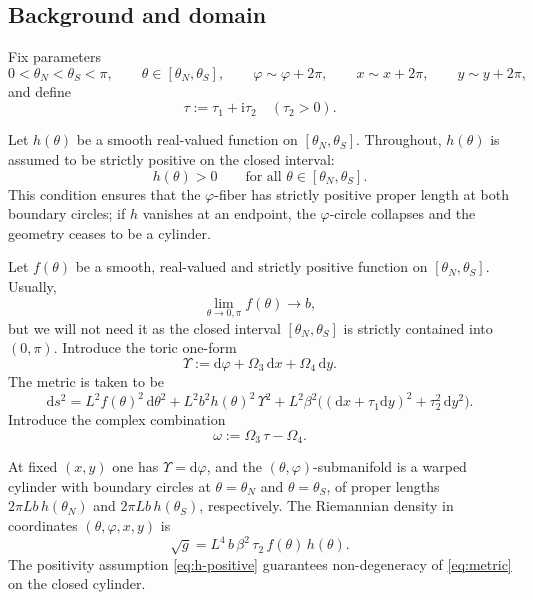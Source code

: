 \documentclass[11pt,a4paper]{article}
\numberwithin{equation}{section}
\theoremstyle{plain}
\theoremstyle{definition}
\theoremstyle{remark}
\newcommand{\ii}{\mathrm{i}}
\newcommand{\dd}{\mathrm{d}}
\begin{document}
\subsection{Background and domain}

Fix parameters
\[
0<\theta_N<\theta_S<\pi,\qquad \theta\in[\theta_N,\theta_S],\qquad
\varphi\sim\varphi+2\pi,\qquad x\sim x+2\pi,\qquad y\sim y+2\pi,
\]
and define
\begin{equation}
\tau:=\tau_1+\ii\tau_2\quad(\tau_2>0).
\label{eq:tau}
\end{equation}


Let $h(\theta)$ be a smooth real-valued function on $[\theta_N,\theta_S]$.
Throughout, $h(\theta)$ is assumed to be strictly positive on the closed interval:
\begin{equation}
h(\theta)>0\qquad \text{for all }\theta\in[\theta_N,\theta_S].
\label{eq:h-positive}
\end{equation}
This condition ensures that the $\varphi$-fiber has strictly positive proper length at both boundary circles; if $h$ vanishes at an endpoint, the $\varphi$-circle collapses and the geometry ceases to be a cylinder.

Let $f(\theta)$ be a smooth, real-valued and strictly positive  function on $[\theta_N,\theta_S]$. Usually,
\begin{equation}
\lim_{\theta\to0, \pi}f(\theta)\to b,
 \label{eq:fdef}
\end{equation}
but we will not need it as the closed interval $[\theta_N, \theta_S]$ is strictly contained into $(0, \pi)$.
Introduce the toric one-form
\begin{equation}
\Upsilon:=\dd\varphi+\Omega_3\,\dd x+\Omega_4\,\dd y .
\label{eq:Upsilon-def}
\end{equation}
The metric is taken to be
\begin{equation}
\dd s^2
=
L^2 f(\theta)^2\,\dd\theta^2
+
L^2 b^2 h(\theta)^2\,\Upsilon^2
+
L^2\beta^2\Big( (\dd x+\tau_1 \dd y)^2+\tau_2^2\,\dd y^2\Big).
\label{eq:metric}
\end{equation}
Introduce the complex combination
\begin{equation}
\omega := \Omega_3\,\tau-\Omega_4 .
\label{eq:omega}
\end{equation}


At fixed $(x,y)$ one has $\Upsilon=\dd\varphi$, and the $(\theta,\varphi)$-submanifold is a warped cylinder with boundary circles at
$\theta=\theta_N$ and $\theta=\theta_S$, of proper lengths $2\pi L b\,h(\theta_N)$ and $2\pi L b\,h(\theta_S)$, respectively.
The Riemannian density in coordinates $(\theta,\varphi,x,y)$ is
\begin{equation}
\sqrt{g}=L^4\,b\,\beta^2\,\tau_2\,f(\theta)\,h(\theta).
\label{eq:sqrtg}
\end{equation}
The positivity assumption \eqref{eq:h-positive} guarantees non-degeneracy of \eqref{eq:metric} on the closed cylinder.
\end{document}
